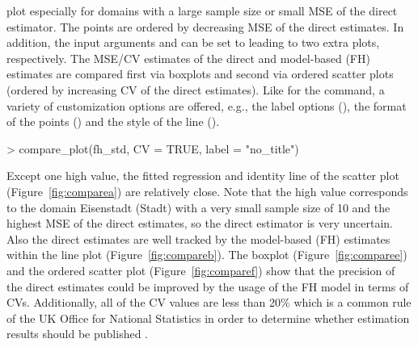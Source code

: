 plot especially for domains with a large sample size or small MSE of the direct
estimator. The points are ordered by decreasing MSE of the direct estimates. In
addition, the input arguments  and  can be set to 
leading to two extra plots, respectively. The MSE/CV estimates of the direct and model-based (FH) estimates are compared first via boxplots and second via
ordered scatter plots (ordered by increasing CV of the direct estimates). Like
for the  command, a variety of customization options are offered, e.g.,
the label options (), the format of the points () and
the style of the line ().
\begin{example}
> compare_plot(fh_std, CV = TRUE, label = "no_title")
\end{example}
Except one high value, the fitted regression and identity line of the scatter
plot (Figure~\ref{fig:comparea}) are relatively close. Note that the high value
corresponds to the domain Eisenstadt (Stadt) with a very small sample size of 10
and the highest MSE of the direct estimates, so the direct estimator is very uncertain. Also the direct estimates are well tracked by the model-based (FH) estimates within the line plot (Figure~\ref{fig:compareb}). The boxplot (Figure~\ref{fig:comparee}) and the ordered scatter plot (Figure~\ref{fig:comparef}) show that the precision of the direct estimates could be improved by the usage of the FH model in terms of CVs. Additionally, all of the CV values are less than 20\% which is a common rule of the UK Office for National Statistics in order to determine whether estimation results should be published \citep{Miltiadou2020}.

